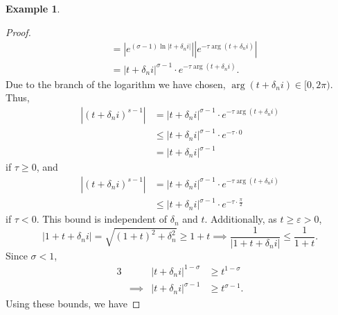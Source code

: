 \documentclass[a4paper]{article}
\theoremstyle{definition}
\newtheorem{example}[theorem]{Example}
\begin{document}
\begin{example}
\begin{proof}
\begin{align*}
                                                            & = \left\lvert e^{(\sigma-1) \ln\lvert t + \delta_n i\rvert} \right\rvert \left\lvert e^{- \tau \arg (t+\delta_n i)} \right\rvert                                                                                                                                   \\
                                                            & = \lvert t + \delta_n i \rvert^{\sigma-1} \cdot e^{- \tau \arg (t+\delta_n i)}.
        \end{align*}
        Due to the branch of the logarithm we have chosen, $\arg(t+\delta_n i) \in [0, 2\pi)$.
        Thus,
        \begin{align*}
            \left\lvert (t + \delta_n i)^{s-1} \right\rvert & = \lvert t + \delta_n i \rvert^{\sigma-1} \cdot e^{- \tau \arg (t+\delta_n i)} \\
                                                            & \leq \lvert t + \delta_n i \rvert^{\sigma-1} \cdot e^{-\tau \cdot 0}           \\
                                                            & = \lvert t + \delta_n i \rvert^{\sigma-1}
        \end{align*}
        if $\tau \geq 0$, and
        \begin{align*}
            \left\lvert (t + \delta_n i)^{s-1} \right\rvert & = \lvert t + \delta_n i \rvert^{\sigma-1} \cdot e^{- \tau \arg (t+\delta_n i)}   \\
                                                            & \leq \lvert t + \delta_n i \rvert^{\sigma-1} \cdot e^{-\tau \cdot \frac{\pi}{2}}
        \end{align*}
        if $\tau < 0$.
        This bound is independent of $\delta_n$ and $t$.
        Additionally, as $t \geq \varepsilon > 0$,
        \begin{equation*}
            \lvert 1 + t + \delta_n i \rvert = \sqrt{(1+t)^2 + \delta_n^2} \geq 1 + t \implies \frac{1}{\lvert 1 + t + \delta_n i \rvert} \leq \frac{1}{1+t}.
        \end{equation*}
        Since $\sigma < 1$,
        \begin{alignat*}{3}
             &          & \lvert t + \delta_n i \rvert^{1-\sigma} & \geq t^{1-\sigma}             \\
             & \implies & \lvert t + \delta_n i \rvert^{\sigma-1} & \geq t^{\sigma-1}           .
        \end{alignat*}
        Using these bounds, we have

\end{proof}
\end{example}
\end{document}
